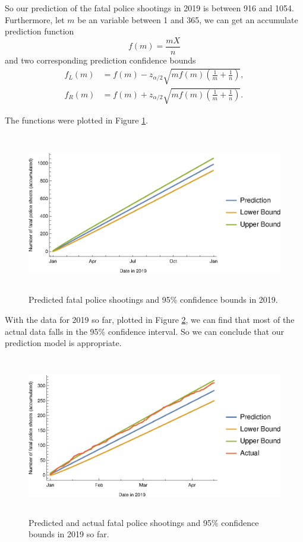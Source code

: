 \documentclass[conf]{new-aiaa}
\begin{document}
So our prediction of the fatal police shootings in 2019 is between 916 and 1054. Furthermore, let $m$ be an variable between 1 and 365, we can get an accumulate prediction function
$$f(m)=\frac{mX}{n}$$
and two corresponding prediction confidence bounds
\begin{align*}
f_L(m)&=f(m)-z_{\alpha / 2} \sqrt{mf(m)\left(\frac{1}{m}+\frac{1}{n}\right)},\\
f_R(m)&=f(m)+z_{\alpha / 2} \sqrt{mf(m)\left(\frac{1}{m}+\frac{1}{n}\right)}.
\end{align*}

The functions were plotted in Figure \ref{fig:q7}.
\begin{figure}[!htbp]
\centering
\includegraphics[height=7cm]{q7/q7.eps}
\caption{Predicted fatal police shootings and 95\% confidence bounds in 2019.}
\label{fig:q7}
\end{figure}

With the data for 2019 so far, plotted in Figure \ref{fig:q7-actual}, we can find that most of the actual data falls in the 95\% confidence interval. So we can conclude that our prediction model is appropriate.

\begin{figure}[!htbp]
\centering
\includegraphics[height=7cm]{q7/q7-actual.eps}
\caption{Predicted and actual fatal police shootings and 95\% confidence bounds in 2019 so far.}
\label{fig:q7-actual}
\end{figure}
\end{document}
